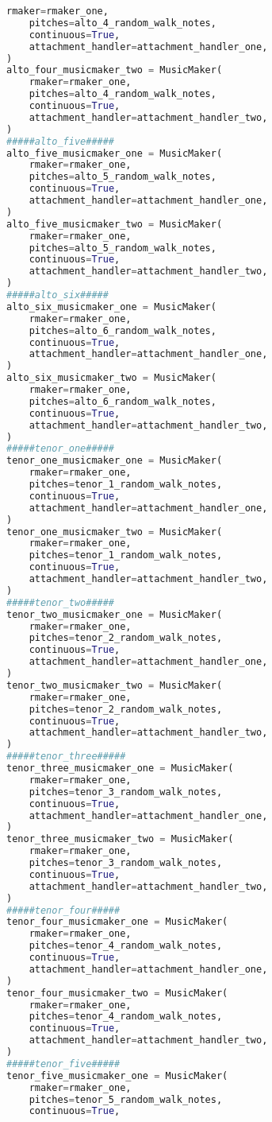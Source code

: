 \begin{lstlisting}[language=Python, caption=Invocation Source Code]
    rmaker=rmaker_one,
    pitches=alto_4_random_walk_notes,
    continuous=True,
    attachment_handler=attachment_handler_one,
)
alto_four_musicmaker_two = MusicMaker(
    rmaker=rmaker_one,
    pitches=alto_4_random_walk_notes,
    continuous=True,
    attachment_handler=attachment_handler_two,
)
#####alto_five#####
alto_five_musicmaker_one = MusicMaker(
    rmaker=rmaker_one,
    pitches=alto_5_random_walk_notes,
    continuous=True,
    attachment_handler=attachment_handler_one,
)
alto_five_musicmaker_two = MusicMaker(
    rmaker=rmaker_one,
    pitches=alto_5_random_walk_notes,
    continuous=True,
    attachment_handler=attachment_handler_two,
)
#####alto_six#####
alto_six_musicmaker_one = MusicMaker(
    rmaker=rmaker_one,
    pitches=alto_6_random_walk_notes,
    continuous=True,
    attachment_handler=attachment_handler_one,
)
alto_six_musicmaker_two = MusicMaker(
    rmaker=rmaker_one,
    pitches=alto_6_random_walk_notes,
    continuous=True,
    attachment_handler=attachment_handler_two,
)
#####tenor_one#####
tenor_one_musicmaker_one = MusicMaker(
    rmaker=rmaker_one,
    pitches=tenor_1_random_walk_notes,
    continuous=True,
    attachment_handler=attachment_handler_one,
)
tenor_one_musicmaker_two = MusicMaker(
    rmaker=rmaker_one,
    pitches=tenor_1_random_walk_notes,
    continuous=True,
    attachment_handler=attachment_handler_two,
)
#####tenor_two#####
tenor_two_musicmaker_one = MusicMaker(
    rmaker=rmaker_one,
    pitches=tenor_2_random_walk_notes,
    continuous=True,
    attachment_handler=attachment_handler_one,
)
tenor_two_musicmaker_two = MusicMaker(
    rmaker=rmaker_one,
    pitches=tenor_2_random_walk_notes,
    continuous=True,
    attachment_handler=attachment_handler_two,
)
#####tenor_three#####
tenor_three_musicmaker_one = MusicMaker(
    rmaker=rmaker_one,
    pitches=tenor_3_random_walk_notes,
    continuous=True,
    attachment_handler=attachment_handler_one,
)
tenor_three_musicmaker_two = MusicMaker(
    rmaker=rmaker_one,
    pitches=tenor_3_random_walk_notes,
    continuous=True,
    attachment_handler=attachment_handler_two,
)
#####tenor_four#####
tenor_four_musicmaker_one = MusicMaker(
    rmaker=rmaker_one,
    pitches=tenor_4_random_walk_notes,
    continuous=True,
    attachment_handler=attachment_handler_one,
)
tenor_four_musicmaker_two = MusicMaker(
    rmaker=rmaker_one,
    pitches=tenor_4_random_walk_notes,
    continuous=True,
    attachment_handler=attachment_handler_two,
)
#####tenor_five#####
tenor_five_musicmaker_one = MusicMaker(
    rmaker=rmaker_one,
    pitches=tenor_5_random_walk_notes,
    continuous=True,

\end{lstlisting}

